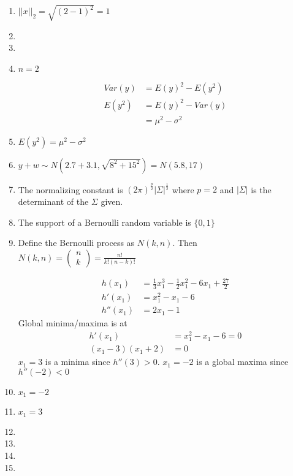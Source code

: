 \documentclass[11pt]{scrartcl}
\begin{document}
\begin{enumerate}
\item $||x||_2 = \sqrt{(2-1)^2} = 1$

\item 

\item

\item $n=2$

\begin{align*}
Var(y) &= E(y)^2 - E(y^2) \\
E(y^2) &= E(y)^2 - Var(y) \\
&= \mu^2 - \sigma^2
\end{align*}
\item $E(y^2) = \mu^2 - \sigma^2$

\item $y + w \sim N(2.7 + 3.1, \sqrt{8^2 + 15^2}) = N(5.8, 17)$

\item The normalizing constant is $(2\pi)^{\frac{p}{2}} |\Sigma|^{\frac{1}{2}}$ where $p=2$ and $|\Sigma|$ is the determinant of the $\Sigma$ given.

\item The support of a Bernoulli random variable is $\{0,1\}$

\item Define the Bernoulli process as $N(k,n)$. Then $N(k,n) = \begin{pmatrix}n \\ k\end{pmatrix} = \frac{n!}{k!(n-k)!}$

\begin{align*}
h(x_1) &= \frac{1}{3}x_1^3 - \frac{1}{2}x_1^2 - 6x_1 + \frac{27}{2} \\
h'(x_1) &= x_1^2 - x_1 - 6 \\
h''(x_1) &= 2x_1 - 1
\end{align*}
Global minima/maxima is at
\begin{align*}
h'(x_1) &= x_1^2 - x_1 - 6 = 0 \\
(x_1 - 3)(x_1+2) &= 0
\end{align*}
$x_1 = 3$ is a minima since $h''(3) > 0$. $x_1 = -2$ is a global maxima since $h''(-2) < 0$
\item $x_1 = -2$

\item $x_1 = 3$

\item 

\item

\item

\item

\end{enumerate}
\end{document}
